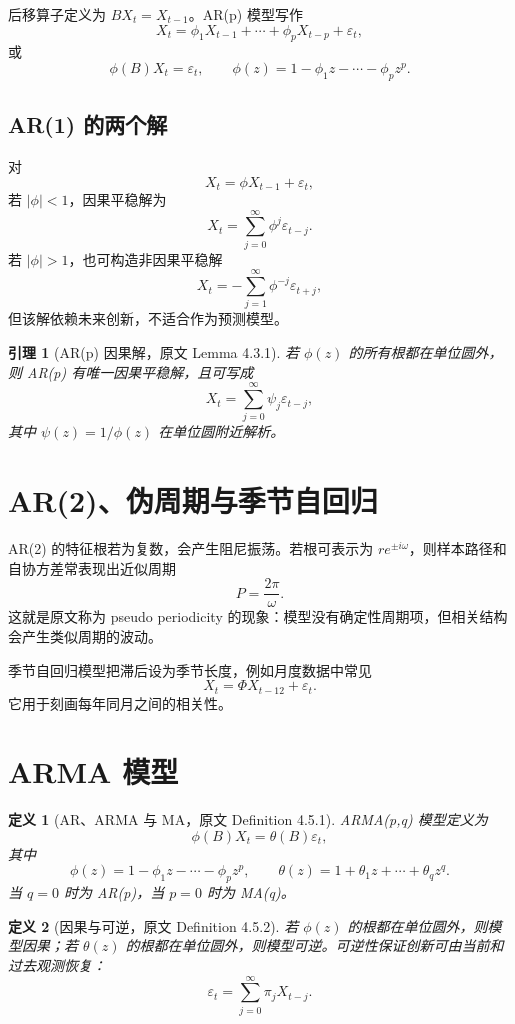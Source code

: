\documentclass[11pt,a4paper,openany]{ctexbook}
\newtheorem{definition}{定义}[section]
\newtheorem{lemma}{引理}[section]
\begin{document}
后移算子定义为 \(BX_t=X_{t-1}\)。AR(p) 模型写作
\[
  X_t=\phi_1X_{t-1}+\cdots+\phi_pX_{t-p}+\varepsilon_t,
\]
或
\[
  \phi(B)X_t=\varepsilon_t,\qquad
  \phi(z)=1-\phi_1z-\cdots-\phi_pz^p.
\]

\subsection{AR(1) 的两个解}

对
\[
  X_t=\phi X_{t-1}+\varepsilon_t,
\]
若 \(|\phi|<1\)，因果平稳解为
\[
  X_t=\sum_{j=0}^{\infty}\phi^j\varepsilon_{t-j}.
\]
若 \(|\phi|>1\)，也可构造非因果平稳解
\[
  X_t=-\sum_{j=1}^{\infty}\phi^{-j}\varepsilon_{t+j},
\]
但该解依赖未来创新，不适合作为预测模型。

\begin{lemma}[AR(p) 因果解，原文 Lemma 4.3.1]
若 \(\phi(z)\) 的所有根都在单位圆外，则 AR(p) 有唯一因果平稳解，且可写成
\[
  X_t=\sum_{j=0}^{\infty}\psi_j\varepsilon_{t-j},
\]
其中 \(\psi(z)=1/\phi(z)\) 在单位圆附近解析。
\end{lemma}

\section{AR(2)、伪周期与季节自回归}

AR(2) 的特征根若为复数，会产生阻尼振荡。若根可表示为 \(re^{\pm i\omega}\)，则样本路径和自协方差常表现出近似周期
\[
  P=\frac{2\pi}{\omega}.
\]
这就是原文称为 pseudo periodicity 的现象：模型没有确定性周期项，但相关结构会产生类似周期的波动。

季节自回归模型把滞后设为季节长度，例如月度数据中常见
\[
  X_t=\Phi X_{t-12}+\varepsilon_t.
\]
它用于刻画每年同月之间的相关性。

\section{ARMA 模型}

\begin{definition}[AR、ARMA 与 MA，原文 Definition 4.5.1]
ARMA(p,q) 模型定义为
\[
  \phi(B)X_t=\theta(B)\varepsilon_t,
\]
其中
\[
  \phi(z)=1-\phi_1z-\cdots-\phi_pz^p,\qquad
  \theta(z)=1+\theta_1z+\cdots+\theta_qz^q.
\]
当 \(q=0\) 时为 AR(p)，当 \(p=0\) 时为 MA(q)。
\end{definition}

\begin{definition}[因果与可逆，原文 Definition 4.5.2]
若 \(\phi(z)\) 的根都在单位圆外，则模型因果；若 \(\theta(z)\) 的根都在单位圆外，则模型可逆。可逆性保证创新可由当前和过去观测恢复：
\[
  \varepsilon_t=\sum_{j=0}^{\infty}\pi_j X_{t-j}.
\]
\end{definition}
\end{document}
